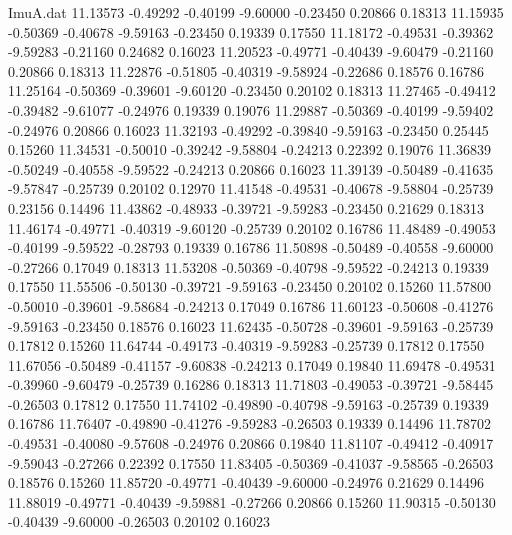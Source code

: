 \begin{filecontents}{ImuA.dat}
  11.13573   -0.49292   -0.40199   -9.60000   -0.23450    0.20866    0.18313
  11.15935   -0.50369   -0.40678   -9.59163   -0.23450    0.19339    0.17550
  11.18172   -0.49531   -0.39362   -9.59283   -0.21160    0.24682    0.16023
  11.20523   -0.49771   -0.40439   -9.60479   -0.21160    0.20866    0.18313
  11.22876   -0.51805   -0.40319   -9.58924   -0.22686    0.18576    0.16786
  11.25164   -0.50369   -0.39601   -9.60120   -0.23450    0.20102    0.18313
  11.27465   -0.49412   -0.39482   -9.61077   -0.24976    0.19339    0.19076
  11.29887   -0.50369   -0.40199   -9.59402   -0.24976    0.20866    0.16023
  11.32193   -0.49292   -0.39840   -9.59163   -0.23450    0.25445    0.15260
  11.34531   -0.50010   -0.39242   -9.58804   -0.24213    0.22392    0.19076
  11.36839   -0.50249   -0.40558   -9.59522   -0.24213    0.20866    0.16023
  11.39139   -0.50489   -0.41635   -9.57847   -0.25739    0.20102    0.12970
  11.41548   -0.49531   -0.40678   -9.58804   -0.25739    0.23156    0.14496
  11.43862   -0.48933   -0.39721   -9.59283   -0.23450    0.21629    0.18313
  11.46174   -0.49771   -0.40319   -9.60120   -0.25739    0.20102    0.16786
  11.48489   -0.49053   -0.40199   -9.59522   -0.28793    0.19339    0.16786
  11.50898   -0.50489   -0.40558   -9.60000   -0.27266    0.17049    0.18313
  11.53208   -0.50369   -0.40798   -9.59522   -0.24213    0.19339    0.17550
  11.55506   -0.50130   -0.39721   -9.59163   -0.23450    0.20102    0.15260
  11.57800   -0.50010   -0.39601   -9.58684   -0.24213    0.17049    0.16786
  11.60123   -0.50608   -0.41276   -9.59163   -0.23450    0.18576    0.16023
  11.62435   -0.50728   -0.39601   -9.59163   -0.25739    0.17812    0.15260
  11.64744   -0.49173   -0.40319   -9.59283   -0.25739    0.17812    0.17550
  11.67056   -0.50489   -0.41157   -9.60838   -0.24213    0.17049    0.19840
  11.69478   -0.49531   -0.39960   -9.60479   -0.25739    0.16286    0.18313
  11.71803   -0.49053   -0.39721   -9.58445   -0.26503    0.17812    0.17550
  11.74102   -0.49890   -0.40798   -9.59163   -0.25739    0.19339    0.16786
  11.76407   -0.49890   -0.41276   -9.59283   -0.26503    0.19339    0.14496
  11.78702   -0.49531   -0.40080   -9.57608   -0.24976    0.20866    0.19840
  11.81107   -0.49412   -0.40917   -9.59043   -0.27266    0.22392    0.17550
  11.83405   -0.50369   -0.41037   -9.58565   -0.26503    0.18576    0.15260
  11.85720   -0.49771   -0.40439   -9.60000   -0.24976    0.21629    0.14496
  11.88019   -0.49771   -0.40439   -9.59881   -0.27266    0.20866    0.15260
  11.90315   -0.50130   -0.40439   -9.60000   -0.26503    0.20102    0.16023

\end{filecontents}
